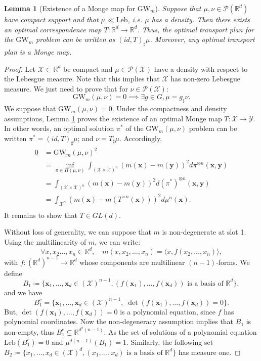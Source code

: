 \documentclass[10pt,a4paper]{amsart}
\newtheorem{lemma}{Lemma}
\newcommand{\GW}{\mathrm{GW}}
\newcommand{\Leb}{\mathrm{Leb}}
\renewcommand{\P}{\mathcal{P}}
\newcommand{\R}{\mathbb{R}}
\newcommand{\X}{\mathcal{X}}
\newcommand{\Y}{\mathcal{Y}}
\begin{document}
\begin{lemma}[Existence of a Monge map for $\GW_m$] \label{lem:Monge_DGW}
    Suppose that $\mu,\nu \in \P(\R^d)$ have compact support and that $\mu\ll \Leb$, i.e. $\mu$ has a density. Then there exists an optimal correspondence map $T:\R^d\to\R^d$. Thus, the optimal transport plan for the $\GW_{m}$ problem can be written as $(id,T)_\sharp\mu$. Moreover, any optimal transport plan is a Monge map.
\end{lemma}

\begin{proof}
    Let $\X\subset\R^d$ be compact and $\mu  \in \P(\X)$ have a density with respect to the Lebesgue measure. Note that this implies that $\X$ has non-zero Lebesgue measure. We just need to prove that for $\nu\in \P(\X)$: \[  \GW_{m}(\mu,\nu)= 0 \implies \exists g\in G, \mu = g_\sharp\nu.\]
    We suppose that $\GW_{m}(\mu,\nu)= 0$. Under the compactness and density assumptions, Lemma \ref{lem:Monge_DGW} proves the existence of an  optimal Monge map $T:\X\to\Y$. In other words, an optimal solution $\pi^*$ of the $\GW_{m}(\mu,\nu)$ problem can be written $\pi^*=(id,T)_\sharp\mu$; and $\nu =T_{\sharp} \mu$. Accordingly,
    \begin{equation*}
        \begin{split}
             0&=\GW_{m}(\mu,\nu)^2\\
             &=\inf_{\pi\in\Pi(\mu,\nu)}\int_{(\X\times\X)^n}(m(\mathbf{x})-m(\mathbf{y}))^2d\pi^{\otimes n}(\mathbf{x},\mathbf{y}) \\
             &=\int_{(\X\times\X)^n}(m(\mathbf{x})-m(\mathbf{y}))^2d(\pi^*)^{\otimes n}(\mathbf{x},\mathbf{y}) \\
             &=\int_{\X^n}(m(\mathbf{x})-m(T^{\times n}(\mathbf{x})))^2d\mu^{n}(\mathbf{x}). \\
        \end{split}
    \end{equation*}
    It remains to show that $T\in GL(d)$. 
    
    Without loss of generality, we can suppose that $m$ is non-degenerate at slot 1.
    Using the multilinearity of $m$, we can write:
    \[\forall x, x_2\dots,x_n\in \R^d,\quad m(x, x_2,\dots,x_n) = \langle x, f(x_2,\dots,x_n)\rangle,\]
    with $f:(\R^d)^{n-1}\to\R^d$ whose components are  multilinear $(n-1)$-forms. We define \[B_1\coloneqq \{\mathbf{x}_1,\dots,\mathbf{x}_{d} \in (\X)^{n-1}, (f(\mathbf{x}_1),\dots,f(\mathbf{x}_d))\text{ is a basis of }\R^d\} ,\] and we have  \[B_1^c  =  \{\mathbf{x}_1,\dots,\mathbf{x}_{d} \in (\X)^{n-1}, \;\det(f(\mathbf{x}_1),\dots,f(\mathbf{x}_d))=0\}.\] But, $\det(f(\mathbf{x}_1),\dots,f(\mathbf{x}_d))=0$ is a polynomial equation, since $f$ has polynomial coordinates. Now the non-degeneracy assumption implies that $B_1$ is non-empty, thus $B_1^c\subsetneq \R^{d^2(n-1)}$. As the set of solutions of a polynomial equation $\Leb(B_1^c)=0$ and $\mu^{d(n-1)}(B_1)=1$. Similarly, the following set $B_2\coloneqq \{x_1,\dots,x_{d} \in (\X)^{d}, (x_1,\dots,x_{d})\text{ is a basis of }\R^d\} $ has measure one. 
    

\end{proof}
\end{document}

